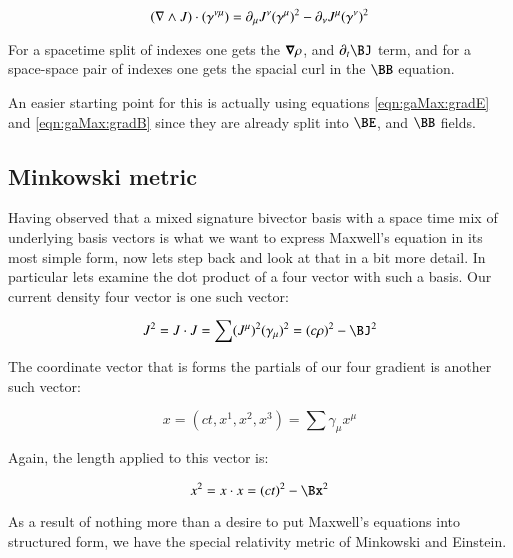 \begin{equation*}
(\nabla \wedge J) \cdot (\gamma^{\nu\mu}) = \partial_{\mu}J^{\nu} (\gamma^{\mu})^2 - \partial_{\nu}J^{\mu} (\gamma^{\nu})^2
\end{equation*}

For a spacetime split of indexes one gets the $\boldsymbol{\nabla}\rho$, and $\partial_t \BJ$ term, and for a space-space pair of indexes one gets the spacial curl in the $\BB$ equation.

An easier starting point for this is actually using equations \ref{eqn:gaMax:gradE} and \ref{eqn:gaMax:gradB} since they are already split into $\BE$, and $\BB$ fields.

\subsection{Minkowski metric }

Having observed that a mixed signature bivector basis with a space time mix of underlying basis vectors is what we want to
express Maxwell's equation in its most simple form, now lets step back and look at that in a bit more detail.  In particular
lets examine the dot product of a four vector with such a basis.  Our current density four vector is one such vector:

\begin{align*}
J^2 = J \cdot J = \sum (J^{\mu})^2 (\gamma_{\mu})^2 = (c\rho)^2 - \BJ^2
\end{align*}

The coordinate vector that is forms the partials of our four gradient is another such vector:

\begin{equation*}
x = (ct, x^1, x^2, x^3) = \sum \gamma_{\mu} x^{\mu}
\end{equation*}

Again, the length applied to this vector is:

\begin{equation}
x^2 = x \cdot x = (ct)^2 - \Bx^2
\end{equation}

As a result of nothing more than a desire to put Maxwell's equations into structured form, we have the special relativity metric
of Minkowski and Einstein.

